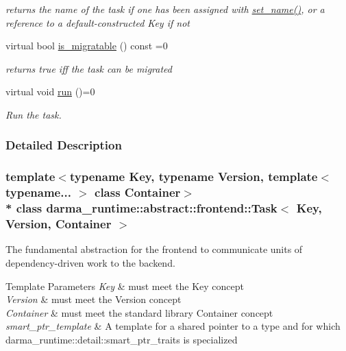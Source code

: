 \begin{DoxyCompactItemize}
\begin{DoxyCompactList}\small\item\em returns the name of the task if one has been assigned with \hyperlink{classdarma__runtime_1_1abstract_1_1frontend_1_1_task_a57f64c02eb91a69fa4167a420392ce3b}{set\+\_\+name()}, or a reference to a default-\/constructed Key if not \end{DoxyCompactList}\item 
virtual bool \hyperlink{classdarma__runtime_1_1abstract_1_1frontend_1_1_task_a219f6b388190a1a4673f6144877b51b8}{is\+\_\+migratable} () const  =0
\begin{DoxyCompactList}\small\item\em returns true iff the task can be migrated \end{DoxyCompactList}\item 
virtual void \hyperlink{classdarma__runtime_1_1abstract_1_1frontend_1_1_task_a0b17be7ac7b74aa1e1c54ce3f527cd14}{run} ()=0
\begin{DoxyCompactList}\small\item\em Run the task. \end{DoxyCompactList}\end{DoxyCompactItemize}


\subsubsection{Detailed Description}
\subsubsection*{template$<$typename Key, typename Version, template$<$ typename... $>$ class Container$>$\\*
class darma\+\_\+runtime\+::abstract\+::frontend\+::\+Task$<$ Key, Version, Container $>$}

The fundamental abstraction for the frontend to communicate units of dependency-\/driven work to the backend. 


\begin{DoxyTemplParams}{Template Parameters}
{\em Key} & must meet the Key concept \\
\hline
{\em Version} & must meet the Version concept \\
\hline
{\em Container} & must meet the standard library Container concept \\
\hline
{\em smart\+\_\+ptr\+\_\+template} & A template for a shared pointer to a type and for which darma\+\_\+runtime\+::detail\+::smart\+\_\+ptr\+\_\+traits is specialized\\
\hline
\end{DoxyTemplParams}


